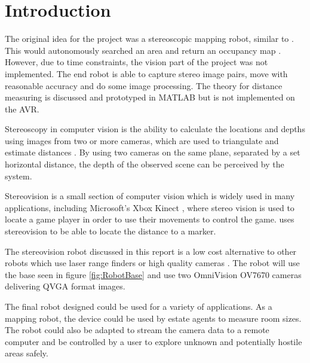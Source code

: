 \chapter{Introduction} \label{Chapter:Introduction}

%
%
%
%


The original idea for the project was a stereoscopic mapping robot, similar to \cite{Pirobot}. This would autonomously searched an area and return an occupancy map \citep{thrun2003learning}. However, due to time constraints, the vision part of the project was not implemented. The end robot is able to capture stereo image pairs, move with reasonable accuracy and do some image processing. The theory for distance measuring is discussed and prototyped in MATLAB but is not implemented on the AVR.

Stereoscopy in computer vision is the ability to calculate the locations and depths using images from two or more cameras, which are used to triangulate and estimate distances \citep{Saxena:DepthEstimation}. By using two cameras on the same plane, separated by a set horizontal distance, the depth of the observed scene can be perceived by the system.

Stereovision is a small section of computer vision which is widely used in many applications, including Microsoft's Xbox Kinect \citep{Microsoft:Kinect}, where stereo vision is used to locate a game player in order to use their movements to control the game. \cite{Mrovlje:Distance_Stereoscopic} uses stereovision to be able to locate the distance to a marker. 

The stereovision robot discussed in this report is a low cost alternative to other robots which use laser range finders or high quality cameras \citep{Se:MappingRobot}. The robot will use the base seen in figure \ref{fig:RobotBase} and use two OmniVision OV7670 cameras delivering QVGA format images.

The final robot designed could be used for a variety of applications. As a mapping robot, the device could be used by estate agents to measure room sizes. The robot could also be adapted to stream the camera data to a remote computer and be controlled by a user to explore unknown and potentially hostile areas safely. 

